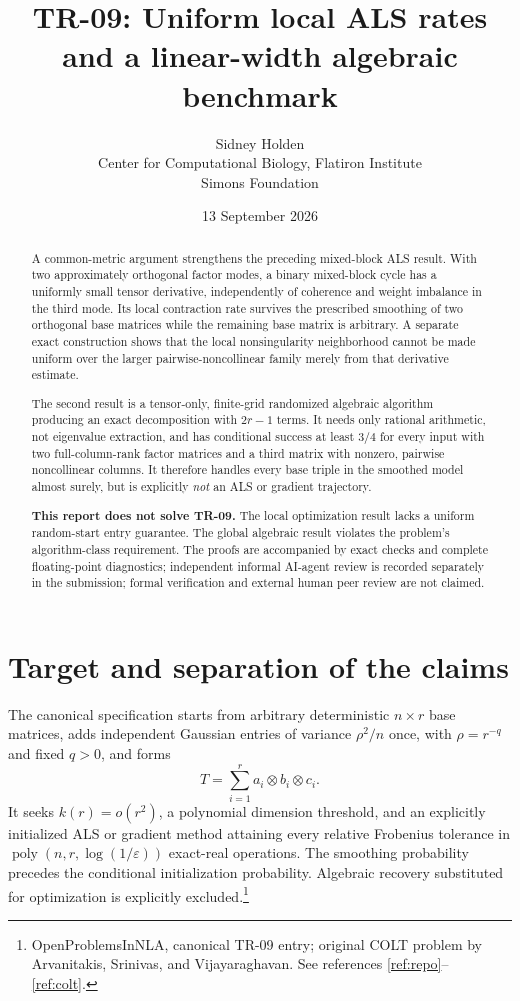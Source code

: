 \documentclass[11pt]{article}
\title{TR-09: Uniform local ALS rates and a linear-width algebraic benchmark}
\author{Sidney Holden\\{\small Center for Computational Biology, Flatiron Institute}\\{\small Simons Foundation}}\date{13 September 2026}
\theoremstyle{remark}\newtheorem{remark}[theorem]{Remark}
\begin{document}
\maketitle
\vspace{-1.4em}
\begin{abstract}
A common-metric argument strengthens the preceding mixed-block ALS result. With two approximately orthogonal factor modes, a binary mixed-block cycle has a uniformly small tensor derivative, independently of coherence and weight imbalance in the third mode. Its local contraction rate survives the prescribed smoothing of two orthogonal base matrices while the remaining base matrix is arbitrary. A separate exact construction shows that the local nonsingularity neighborhood cannot be made uniform over the larger pairwise-noncollinear family merely from that derivative estimate.

The second result is a tensor-only, finite-grid randomized algebraic algorithm producing an exact decomposition with $2r-1$ terms. It needs only rational arithmetic, not eigenvalue extraction, and has conditional success at least $3/4$ for every input with two full-column-rank factor matrices and a third matrix with nonzero, pairwise noncollinear columns. It therefore handles every base triple in the smoothed model almost surely, but is explicitly \emph{not} an ALS or gradient trajectory.

\textbf{This report does not solve TR-09.} The local optimization result lacks a uniform random-start entry guarantee. The global algebraic result violates the problem's algorithm-class requirement. The proofs are accompanied by exact checks and complete floating-point diagnostics; independent informal AI-agent review is recorded separately in the submission; formal verification and external human peer review are not claimed.
\end{abstract}

\section{Target and separation of the claims}
The canonical specification starts from arbitrary deterministic $n\times r$ base matrices, adds independent Gaussian entries of variance $\rho^2/n$ once, with $\rho=r^{-q}$ and fixed $q>0$, and forms
\begin{equation}\label{eq:target}
 T=\sum_{i=1}^r a_i\otimes b_i\otimes c_i.
\end{equation}
It seeks $k(r)=o(r^2)$, a polynomial dimension threshold, and an explicitly initialized ALS or gradient method attaining every relative Frobenius tolerance in $\operatorname{poly}(n,r,\log(1/\varepsilon))$ exact-real operations. The smoothing probability precedes the conditional initialization probability. Algebraic recovery substituted for optimization is explicitly excluded.\footnote{OpenProblemsInNLA, canonical TR-09 entry; original COLT problem by Arvanitakis, Srinivas, and Vijayaraghavan. See references \ref{ref:repo}--\ref{ref:colt}.}
\end{document}

